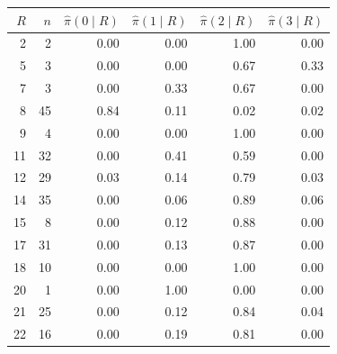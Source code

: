 \begin{tabular}{rrrrrr}
\toprule
$R$ & $n$ & $\hat\pi(0\mid R)$ & $\hat\pi(1\mid R)$ & $\hat\pi(2\mid R)$ & $\hat\pi(3\mid R)$ \\
\midrule
2 & 2 & 0.00 & 0.00 & 1.00 & 0.00 \\
5 & 3 & 0.00 & 0.00 & 0.67 & 0.33 \\
7 & 3 & 0.00 & 0.33 & 0.67 & 0.00 \\
8 & 45 & 0.84 & 0.11 & 0.02 & 0.02 \\
9 & 4 & 0.00 & 0.00 & 1.00 & 0.00 \\
11 & 32 & 0.00 & 0.41 & 0.59 & 0.00 \\
12 & 29 & 0.03 & 0.14 & 0.79 & 0.03 \\
14 & 35 & 0.00 & 0.06 & 0.89 & 0.06 \\
15 & 8 & 0.00 & 0.12 & 0.88 & 0.00 \\
17 & 31 & 0.00 & 0.13 & 0.87 & 0.00 \\
18 & 10 & 0.00 & 0.00 & 1.00 & 0.00 \\
20 & 1 & 0.00 & 1.00 & 0.00 & 0.00 \\
21 & 25 & 0.00 & 0.12 & 0.84 & 0.04 \\
22 & 16 & 0.00 & 0.19 & 0.81 & 0.00 \\
\bottomrule
\end{tabular}
